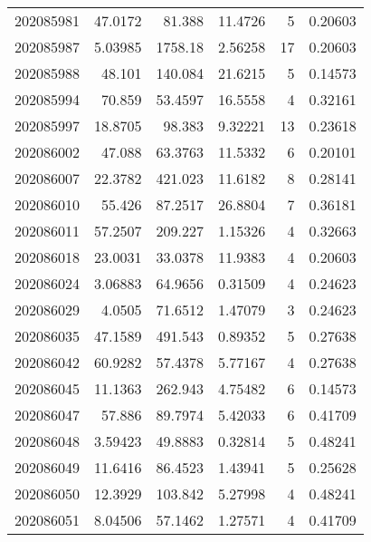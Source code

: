 \begin{tabular}{rrrrrr}
 202085981 &         47.0172  &       81.388  &           11.4726  &           5 & 0.20603 \\
 202085987 &          5.03985 &     1758.18   &            2.56258 &          17 & 0.20603 \\
 202085988 &         48.101   &      140.084  &           21.6215  &           5 & 0.14573 \\
 202085994 &         70.859   &       53.4597 &           16.5558  &           4 & 0.32161 \\
 202085997 &         18.8705  &       98.383  &            9.32221 &          13 & 0.23618 \\
 202086002 &         47.088   &       63.3763 &           11.5332  &           6 & 0.20101 \\
 202086007 &         22.3782  &      421.023  &           11.6182  &           8 & 0.28141 \\
 202086010 &         55.426   &       87.2517 &           26.8804  &           7 & 0.36181 \\
 202086011 &         57.2507  &      209.227  &            1.15326 &           4 & 0.32663 \\
 202086018 &         23.0031  &       33.0378 &           11.9383  &           4 & 0.20603 \\
 202086024 &          3.06883 &       64.9656 &            0.31509 &           4 & 0.24623 \\
 202086029 &          4.0505  &       71.6512 &            1.47079 &           3 & 0.24623 \\
 202086035 &         47.1589  &      491.543  &            0.89352 &           5 & 0.27638 \\
 202086042 &         60.9282  &       57.4378 &            5.77167 &           4 & 0.27638 \\
 202086045 &         11.1363  &      262.943  &            4.75482 &           6 & 0.14573 \\
 202086047 &         57.886   &       89.7974 &            5.42033 &           6 & 0.41709 \\
 202086048 &          3.59423 &       49.8883 &            0.32814 &           5 & 0.48241 \\
 202086049 &         11.6416  &       86.4523 &            1.43941 &           5 & 0.25628 \\
 202086050 &         12.3929  &      103.842  &            5.27998 &           4 & 0.48241 \\
 202086051 &          8.04506 &       57.1462 &            1.27571 &           4 & 0.41709 \\

\end{tabular}
